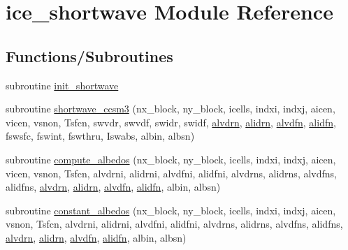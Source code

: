 \hypertarget{namespaceice__shortwave}{
\section{ice\_\-shortwave Module Reference}
\label{namespaceice__shortwave}
}
\subsection*{Functions/Subroutines}
\begin{DoxyCompactItemize}
\item 
subroutine \hyperlink{namespaceice__shortwave_a7fcf82fc93a6d2834b14022890d38a39}{init\_\-shortwave}
\item 
subroutine \hyperlink{namespaceice__shortwave_ac077c2ab2eaf6ffb2c973427e9a9b2d0}{shortwave\_\-ccsm3} (nx\_\-block, ny\_\-block, icells, indxi, indxj, aicen, vicen, vsnon, Tsfcn, swvdr, swvdf, swidr, swidf, \hyperlink{namespaceice__shortwave_a2230448dab2863bca3e1997a89f3412d}{alvdrn}, \hyperlink{namespaceice__shortwave_ad5fc075ea048baae3a2fec2c1cf5233d}{alidrn}, \hyperlink{namespaceice__shortwave_ac6d77b12a1e61fb0b9d1e9639f3ee6ec}{alvdfn}, \hyperlink{namespaceice__shortwave_a8b8421d0ec544285f307d5d10d456e98}{alidfn}, fswsfc, fswint, fswthru, Iswabs, albin, albsn)
\item 
subroutine \hyperlink{namespaceice__shortwave_acd85d1094cb6791a6745cc10dfcebc31}{compute\_\-albedos} (nx\_\-block, ny\_\-block, icells, indxi, indxj, aicen, vicen, vsnon, Tsfcn, alvdrni, alidrni, alvdfni, alidfni, alvdrns, alidrns, alvdfns, alidfns, \hyperlink{namespaceice__shortwave_a2230448dab2863bca3e1997a89f3412d}{alvdrn}, \hyperlink{namespaceice__shortwave_ad5fc075ea048baae3a2fec2c1cf5233d}{alidrn}, \hyperlink{namespaceice__shortwave_ac6d77b12a1e61fb0b9d1e9639f3ee6ec}{alvdfn}, \hyperlink{namespaceice__shortwave_a8b8421d0ec544285f307d5d10d456e98}{alidfn}, albin, albsn)
\item 
subroutine \hyperlink{namespaceice__shortwave_a09ea7e76b2fb504e04e9b85aa63f2ac8}{constant\_\-albedos} (nx\_\-block, ny\_\-block, icells, indxi, indxj, aicen, vsnon, Tsfcn, alvdrni, alidrni, alvdfni, alidfni, alvdrns, alidrns, alvdfns, alidfns, \hyperlink{namespaceice__shortwave_a2230448dab2863bca3e1997a89f3412d}{alvdrn}, \hyperlink{namespaceice__shortwave_ad5fc075ea048baae3a2fec2c1cf5233d}{alidrn}, \hyperlink{namespaceice__shortwave_ac6d77b12a1e61fb0b9d1e9639f3ee6ec}{alvdfn}, \hyperlink{namespaceice__shortwave_a8b8421d0ec544285f307d5d10d456e98}{alidfn}, albin, albsn)
\item 

\end{DoxyCompactItemize}
